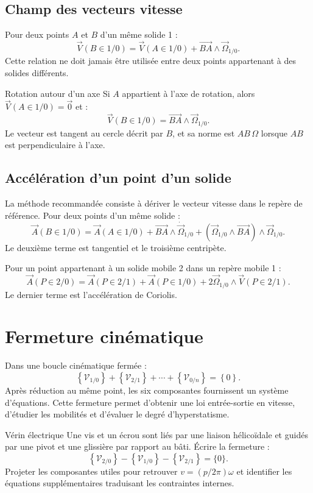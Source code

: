 \subsection{Champ des vecteurs vitesse}

Pour deux points $A$ et $B$ d'un même solide 1 :
\[
\boxed{
\vec V(B\in1/0)
=\vec V(A\in1/0)+\overrightarrow{BA}\wedge\vec\Omega_{1/0}.}
\]
Cette relation ne doit jamais être utilisée entre deux points appartenant
à des solides différents.

\begin{TLCineApp}{Rotation autour d'un axe}
Si $A$ appartient à l'axe de rotation, alors
$\vec V(A\in1/0)=\vec0$ et :
\[
\vec V(B\in1/0)=\overrightarrow{BA}\wedge\vec\Omega_{1/0}.
\]
Le vecteur est tangent au cercle décrit par $B$, et sa norme est
$AB\,\Omega$ lorsque $AB$ est perpendiculaire à l'axe.
\end{TLCineApp}

\subsection{Accélération d'un point d'un solide}

La méthode recommandée consiste à dériver le vecteur vitesse dans le
repère de référence. Pour deux points d'un même solide :
\[
\vec A(B\in1/0)=\vec A(A\in1/0)
+\overrightarrow{BA}\wedge\dot{\vec\Omega}_{1/0}
+(\vec\Omega_{1/0}\wedge\overrightarrow{BA})
\wedge\vec\Omega_{1/0}.
\]
Le deuxième terme est tangentiel et le troisième centripète.

Pour un point appartenant à un solide mobile 2 dans un repère mobile 1 :
\[
\boxed{
\vec A(P\in2/0)=\vec A(P\in2/1)+\vec A(P\in1/0)
+2\vec\Omega_{1/0}\wedge\vec V(P\in2/1).}
\]
Le dernier terme est l'accélération de Coriolis.

\section{Fermeture cinématique}
\label{sec:cine-fermeture}

Dans une boucle cinématique fermée :
\[
\boxed{
\left\{\mathcal V_{1/0}\right\}
+\left\{\mathcal V_{2/1}\right\}
+\cdots+
\left\{\mathcal V_{0/n}\right\}
=\left\{0\right\}.}
\]
Après réduction au même point, les six composantes fournissent un
système d'équations. Cette fermeture permet d'obtenir une loi
entrée-sortie en vitesse, d'étudier les mobilités et d'évaluer le degré
d'hyperstatisme.

\begin{TLCineApp}{Vérin électrique}
Une vis et un écrou sont liés par une liaison hélicoïdale et guidés par
une pivot et une glissière par rapport au bâti. Écrire la fermeture :
\[
\left\{\mathcal V_{2/0}\right\}
-\left\{\mathcal V_{1/0}\right\}
-\left\{\mathcal V_{2/1}\right\}=\{0\}.
\]
Projeter les composantes utiles pour retrouver
$v=(p/2\pi)\omega$ et identifier les équations supplémentaires
traduisant les contraintes internes.
\end{TLCineApp}

